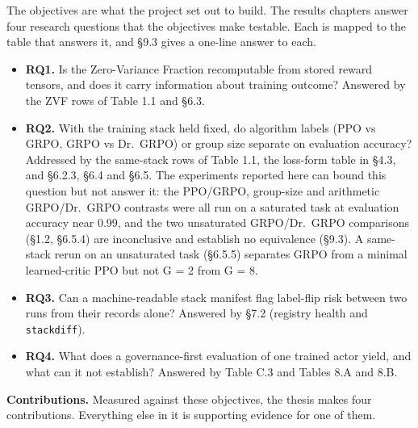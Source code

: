 \documentclass[12pt,a4paper]{report}
\providecommand{\tightlist}{%
  \setlength{\itemsep}{0pt}\setlength{\parskip}{0pt}}
\begin{document}
The objectives are what the project set out to build. The results
chapters answer four research questions that the objectives make
testable. Each is mapped to the table that answers it, and §9.3 gives a
one-line answer to each.

\begin{itemize}
\tightlist
\item
  \textbf{RQ1.} Is the Zero-Variance Fraction recomputable from stored
  reward tensors, and does it carry information about training outcome?
  Answered by the ZVF rows of Table 1.1 and §6.3.
\item
  \textbf{RQ2.} With the training stack held fixed, do algorithm labels
  (PPO vs GRPO, GRPO vs Dr.~GRPO) or group size separate on evaluation
  accuracy? Addressed by the same-stack rows of Table 1.1, the loss-form
  table in §4.3, and §6.2.3, §6.4 and §6.5. The experiments reported
  here can bound this question but not answer it: the PPO/GRPO,
  group-size and arithmetic GRPO/Dr.~GRPO contrasts were all run on a
  saturated task at evaluation accuracy near 0.99, and the two
  unsaturated GRPO/Dr.~GRPO comparisons (§1.2, §6.5.4) are inconclusive
  and establish no equivalence (§9.3). A same-stack rerun on an
  unsaturated task (§6.5.5) separates GRPO from a minimal learned-critic
  PPO but not G = 2 from G = 8.
\item
  \textbf{RQ3.} Can a machine-readable stack manifest flag label-flip
  risk between two runs from their records alone? Answered by §7.2
  (registry health and \texttt{stackdiff}).
\item
  \textbf{RQ4.} What does a governance-first evaluation of one trained
  actor yield, and what can it not establish? Answered by Table C.3 and
  Tables 8.A and 8.B.
\end{itemize}

\textbf{Contributions.} Measured against these objectives, the thesis
makes four contributions. Everything else in it is supporting evidence
for one of them.
\end{document}
